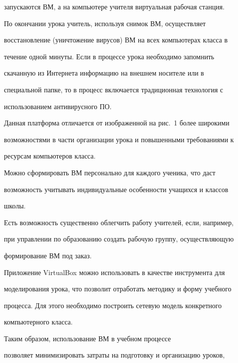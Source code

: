 запускаются ВМ, а на компьютере учителя виртуальная рабочая станция. 





По окончании урока учитель, используя снимок ВМ, осуществляет 


вос\-ста\-нов\-ле\-ние (уничтожение вирусов) ВМ на всех компьютерах класса в 


течение одной минуты. Если в процессе урока необходимо запомнить 


скачанную из Ин\-тер\-не\-та информацию на внешнем носителе или в 


специальной папке, то в процесс включается традиционная технология с 


использованием антивирусного ПО.





Данная платформа отличается от изображенной на рис.~1 более широкими 


возможностями в части организации урока и повышенными требованиями к 


ресурсам компьютеров класса.





Можно сформировать ВМ персонально для каждого ученика, что даст 


возможность учитывать индивидуальные особенности учащихся и классов 


школы.





Есть возможность существенно облегчить работу учителей, если, например, 


при управлении по образованию создать рабочую группу, осуществляющую 


формирование ВМ под заказ.





Приложение VirtualBox можно использовать в качестве инструмента для 


моделирования урока, что позволит отработать методику и форму учебного 


процесса. Для этого необходимо построить сетевую модель конкретного 


компьютерного класса. 





Таким образом, использование ВМ в учебном процессе 


позволяет минимизировать затраты на подготовку и организацию уроков, 


